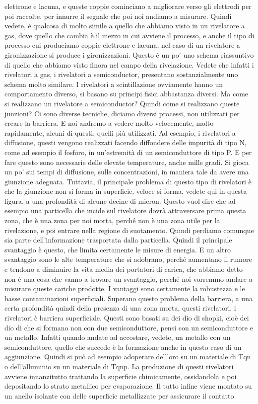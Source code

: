 elettrone e lacuna, e queste coppie cominciano a migliorare verso gli elettrodi per poi raccolte, per innurre il segnale che poi noi andiamo a misurare. Quindi vedete, è qualcosa di molto simile a quello che abbiamo visto in un rivelatore a gas, dove quello che cambia è il mezzo in cui avviene il processo, e anche il tipo di processo cui produciamo coppie elettrone e lacuna, nel caso di un rivelatore a gironizzazione si produce i gironizzazioni. Questo è un po' uno schema riassuntivo di quello che abbiamo visto finora nel campo della rivelazione. Vedete che infatti i rivelatori a gas, i rivelatori a semiconductor, presentano sostanzialmente uno schema molto similare. I rivelatori a scintillazione ovviamente hanno un comportamento diverso, si basano su principi fisici abbastanza diversi. Ma come si realizzano un rivelatore a semiconductor? Quindi come si realizzano queste junzioni? Ci sono diverse tecniche, diciamo diversi processi, non utilizzati per creare la barriera. E noi andremo a vedere molto velocemente, molto rapidamente, alcuni di questi, quelli più utilizzati. Ad esempio, i rivelatori a diffusione, questi vengono realizzati facendo diffondere delle impurità di tipo N, come ad esempio il fosforo, in un'estremità di un semiconduttore di tipo P. E per fare questo sono necessarie delle elevate temperature, anche mille gradi. Si gioca un po' sui tempi di diffusione, sulle concentrazioni, in maniera tale da avere una giunzione adeguata. Tuttavia, il principale problema di questo tipo di rivelatori è che la giunzione non si forma in superficie, veloce si forma, vedete qui in questa figura, a una profondità di alcune decine di micron. Questo vuol dire che ad esempio una particella che incide sul rivelatore dovrà attraversare prima questa zona, che è una zona per noi morta, perché non è una zona utile per la rivelazione, e poi entrare nella regione di suotamento. Quindi perdiamo comunque sia parte dell'informazione trasportata dalla particella. Quindi il principale svantaggio è questo, che limita certamente le misure di energia. E un altro svantaggio sono le alte temperature che si adobrano, perché aumentano il rumore e tendono a diminuire la vita media dei portatori di carica, che abbiamo detto non è una cosa che vanno a trovare un svantaggio, perché noi vorremmo andare a misurare queste cariche prodotte. I vantaggi sono certamente la robustezza e le basse contaminazioni superficiali. Superano questo problema della barriera, a una certa profondità quindi della presenza di una zona morta, questi rivelatori, i rivelatori è barriera superficiale. Questi sono basati su dei dio di shopki, cioè dei dio di che si formano non con due semiconduttore, pensi con un semiconduttore e un metallo. Infatti quando andate ad accostare, vedete, un metallo con un semiconduttore, quello che succede è la formazione anche in questo caso di un aggiunzione. Quindi si può ad esempio adoperare dell'oro su un materiale di Tqn o dell'alluminio su un materiale di Tqnp. La produzione di questi rivelatori avviene innanzitutto trattando la superficie chimicamente, ossidandola e poi depositando lo strato metallico per evaporazione. Il tutto infine viene montato su un anello isolante con delle superficie metallizzate per assicurare il contatto 


